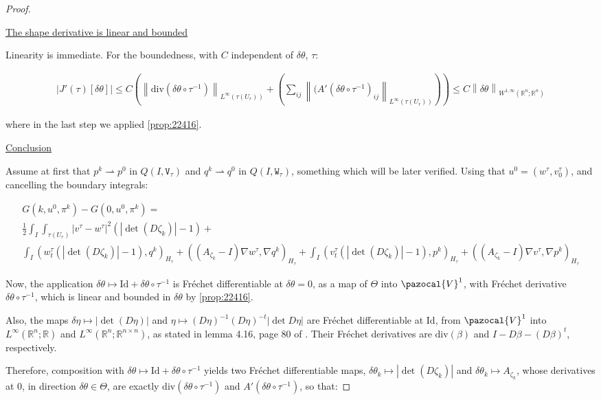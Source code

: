 \documentclass[english,a4paper,9pt,oneside]{scrbook}	%
\theoremstyle{break}
\newenvironment{mproof}[1][\proofname]{%
  \begin{proof}[#1]$ $\par\nobreak\ignorespaces
}{%
  \end{proof}
}
\renewcommand*{\proofname}{Proof}
\theoremstyle{remark}
\newcommand{\mR}{\mathbb{R}}
\newcommand{\cV}{\pazocal{V}}
\newcommand{\norm}[1]{\left\lVert#1\right\rVert}
\newcommand{\cT}{\pazocal{T}}
\newcommand{\id}{\text{Id}}
\newcommand{\te}{\theta}
\newcommand{\Te}{\Theta}
\newcommand{\dive}{\text{div}}
\newcommand{\weakc}{\rightharpoonup}
\newcommand{\tw}[1]{\texttt{#1}}
\begin{document}
\begin{mproof}

\underline{The shape derivative is linear and bounded}

Linearity is immediate. For the boundedness, with $C$ independent of $\delta \te$, $\tau$:

\begin{align*}
|J'(\tau)[\delta \te]| \leq C \left ( \norm{\dive(\delta \te\circ  \tau^{-1})}_{L^\infty(\tau(U_r))}+\left(\sum_{ij} \norm{(A'(\delta\te \circ \tau^{-1})_{ij}}_{L^\infty(\tau(U_r))}\right )\right )\leq
C\norm{\delta \te }_{W^{1,\infty}(\mR^n;\mR^n)}
\end{align*}

where in the last step we applied \cref{prop:22416}. 

\underline{Conclusion}

Assume at first that $p^k \weakc p^0$ in $Q(I,\tw{V}_\tau)$ and $q^k \weakc q^0$ in $Q(I,\tw{W}_\tau)$, something which will be later verified. Using that $u^0=(w^\tau, v_0^\tau)$, and cancelling the boundary integrals:

\begin{align*}
G(k,u^0,\pi^k)-G(0,u^0,\pi^k) =\\
\frac{1}{2}\int_I \int_{\tau(U_r)}|v^\tau-w^\tau|^2(|\det(D\zeta_k)|-1)+\\
\int_I ( w_t^\tau (|\det(D\zeta_k)| -1), q^k)_{H_\tau}+ ((A_{\zeta_k}-I)\nabla w^\tau, \nabla q^k)_{H_\tau}+
\int_I (v_t^\tau (|\det(D\zeta_k)|-1),p^k )_{H_\tau} + ((A_{\zeta_k}-I) \nabla v^\tau, \nabla p^k)_{H_\tau} 
\end{align*}

Now, the application $\delta \te \mapsto \id +\delta \te \circ \tau^{-1}$ is Fréchet differentiable at $\delta \te =0$, as a map of $\Te$ into $\cV^1$, with Fréchet derivative $\delta \te \circ \tau^{-1}$, which is linear and bounded in $\delta \te$ by \cref{prop:22416}.

Also, the maps $\delta \eta \mapsto |\det(D\eta)|$ and $\eta\mapsto (D\eta)^{-1}(D\eta)^{-t}|\det D\eta|$ are Fréchet differentiable at $\id$, from $\cV^1$ into $L^\infty(\mR^n;\mR)$ and $L^\infty(\mR^n;\mR^{n\times n})$, as stated in lemma 4.16, page 80 of \cite{lindemann}. Their Fréchet derivatives are $\dive (\beta)$ and $I-D\beta-(D\beta)^t$, respectively.

Therefore, composition with  $\delta \te  \mapsto \id+ \delta \te \circ \tau^{-1}$ yields two Fréchet differentiable maps, $\delta \te_k \mapsto |\det(D\zeta_k)|$ and $\delta \te_k \mapsto A_{\zeta_k}$, whose derivatives at $0$, in direction $\delta \te \in \Te$, are exactly $\dive(\delta \te \circ \tau^{-1})$ and $A'(\delta \te \circ \tau^{-1})$, so that:


\end{mproof}
\end{document}
